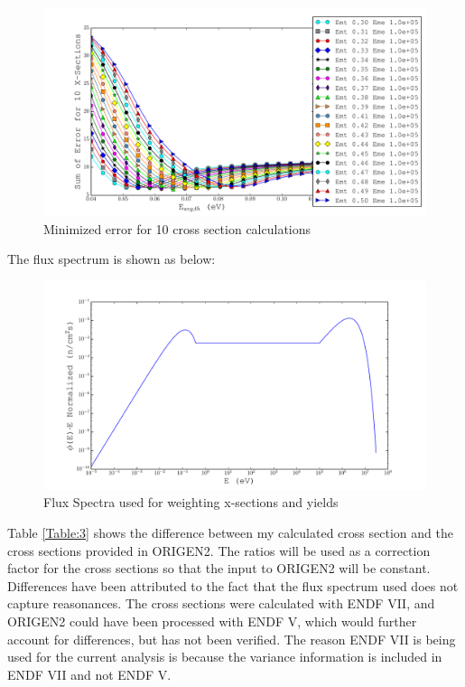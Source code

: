\documentclass[11pt,notitlepage]{article}
\begin{document}
\begin{todolist}
  \begin{figure}[H]
    \begin{center}
      \includegraphics[width=0.9\columnwidth]{../Weighting/Reduce_Err/E0_vs_SumErr_third.pdf}
      \vspace{-5mm}
      \caption{Minimized error for 10 cross section calculations}
      \label{fig:err}
    \end{center}
  \end{figure}
  
  The flux spectrum is shown as below:

  \begin{figure}[H]
    \begin{center}
      \includegraphics[width=0.9\columnwidth]{../Weighting/Flux_Spectra.pdf}
      \vspace{-5mm}
      \caption{Flux Spectra used for weighting x-sections and yields}
      \label{fig:Flux}
    \end{center}
  \end{figure}

  Table \ref{Table:3} shows the difference between my calculated cross
  section and the cross sections provided in ORIGEN2.
  The ratios will be used as a correction factor for the cross sections
  so that the input to ORIGEN2 will be constant.
  Differences
  have been attributed to the fact that the flux spectrum used
  does not capture reasonances. The cross sections were calculated
  with ENDF VII, and ORIGEN2 could have been processed with ENDF V,
  which would further account for differences, but has not been
  verified. The reason ENDF VII is being used for the current
  analysis is because the variance information is included
  in ENDF VII and not ENDF V.



\end{todolist}
\end{document}

